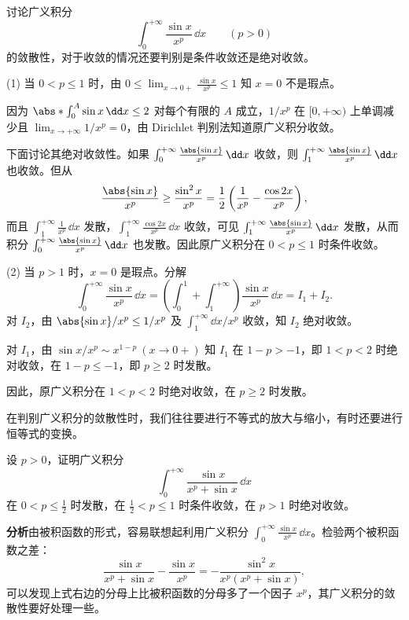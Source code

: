 \begin{xexample}[12.2.3]
讨论广义积分
\[
  \int_0^{+\infty}\frac{\sin x}{x^p}\,\dd x\qquad(p>0)
\]
的敛散性，对于收敛的情况还要判别是条件收敛还是绝对收敛。
\end{xexample}
\begin{xsolution}
(1) 当 $0<p\leq1$ 时，由 $0\leq\lim_{x\to0+}\frac{\sin x}{x^p}\leq1$ 知 $x=0$ 不是瑕点。

因为 $\abs*{\int_0^A\sin x\,\dd x}\leq2$ 对每个有限的 $A$ 成立，$1/x^p$ 在 $[0,+\infty)$ 上单调减少且 $\lim_{x\to+\infty}1/x^p=0$，由 Dirichlet 判别法知道原广义积分收敛。

下面讨论其绝对收敛性。如果 $\int_0^{+\infty}\frac{\abs{\sin x}}{x^p}\,\dd x$ 收敛，则 $\int_1^{+\infty}\frac{\abs{\sin x}}{x^p}\,\dd x$ 也收敛。但从
\[
  \frac{\abs{\sin x}}{x^p}\geq\frac{\sin^2x}{x^p}=\frac12\left(\frac1{x^p}-\frac{\cos2x}{x^p}\right),
\]
而且 $\int_1^{+\infty}\frac1{x^p}\,\dd x$ 发散，$\int_1^{+\infty}\frac{\cos2x}{x^p}\,\dd x$ 收敛，可见 $\int_1^{+\infty}\frac{\abs{\sin x}}{x^p}\,\dd x$ 发散，从而积分 $\int_0^{+\infty}\frac{\abs{\sin x}}{x^p}\,\dd x$ 也发散。因此原广义积分在 $0<p\leq1$ 时条件收敛。

(2) 当 $p>1$ 时，$x=0$ 是瑕点。分解
\[
  \int_0^{+\infty}\frac{\sin x}{x^p}\,\dd x
  =\left(\int_0^1+\int_1^{+\infty}\right)\frac{\sin x}{x^p}\,\dd x=I_1+I_2.
\]
对 $I_2$，由 $\abs{\sin x}/x^p\leq1/x^p$ 及 $\int_1^{+\infty}\dd x/x^p$ 收敛，知 $I_2$ 绝对收敛。

对 $I_1$，由 $\sin x/x^p\sim x^{1-p}\ (x\to0+)$ 知 $I_1$ 在 $1-p>-1$，即 $1<p<2$ 时绝对收敛，在 $1-p\leq-1$，即 $p\geq2$ 时发散。

因此，原广义积分在 $1<p<2$ 时绝对收敛，在 $p\geq2$ 时发散。
\end{xsolution}

在判别广义积分的敛散性时，我们往往要进行不等式的放大与缩小，有时还要进行恒等式的变换。

\begin{xexample}[12.2.4]
设 $p>0$，证明广义积分
\[
  \int_0^{+\infty}\frac{\sin x}{x^p+\sin x}\,\dd x
\]
在 $0<p\leq\frac12$ 时发散，在 $\frac12<p\leq1$ 时条件收敛，在 $p>1$ 时绝对收敛。
\end{xexample}

\textbf{分析}\quad 由被积函数的形式，容易联想起利用广义积分 $\int_0^{+\infty}\frac{\sin x}{x^p}\,\dd x$。检验两个被积函数之差：
\begin{equation}
  \frac{\sin x}{x^p+\sin x}-\frac{\sin x}{x^p}
  =-\frac{\sin^2x}{x^p(x^p+\sin x)},
  \tag{12.4}
  \label{eq:12.4}
\end{equation}
可以发现上式右边的分母上比被积函数的分母多了一个因子 $x^p$，其广义积分的敛散性要好处理一些。

